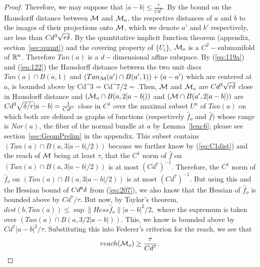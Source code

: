 \documentclass[final, 12pt]{colt2018} %
\begin{document}
\begin{proof}
Therefore, we may suppose that $|a-b| \leq \frac{\tau}{Cd^7}$.
By the bound on the Hausdorff distance between $\mathcal M$ and $\mathcal M_o$, the respective distances of $a$ and $b$ to the images of their projections onto $\mathcal M$, which we denote $a'$ and $b'$ respectively, are less than $Cd^3 \sqrt{r {\mathbf{\delta}}}$. By the quantitative implicit function theorem (appendix, section~\ref{sec:quant}) and the covering property of $\{U_i\}$, $\mathcal M_o$ is a $C^2-$submanifold of $\mathbb R^n$. Therefore $Tan(a)$ is a $d-$dimensional affine subspace. By  (\ref{eq:119a}) and (\ref{eq:122}) the Hausdorff distance between the two unit discs $Tan(a) \cap B(a, 1)$ and $(Tan_\mathcal M(a') \cap B(a',  1)) + (a - a')$ which are centered at $a$, is bounded above by \beq {} Cd^3  = Cd^{7/2}  = .\eeq Then, $\mathcal M$ and $\mathcal M_o$ are $Cd^3 \sqrt{r {\mathbf{\delta}}}$ close in Hausdorff distance and 
$(\mathcal M_o \cap B(a, 2|a-b|))$ and $(\mathcal M \cap B(a',  2|a-b|))$ are $Cd^3 \sqrt{{\mathbf{\delta}}/r}|a-b| = \frac{1}{Cd^{C}}$ close in $C^1$ over the maximal subset $U^a$ of $Tan(a)$ on which both are defined as graphs of functions  (respectively $\hat{f}_o$ and $\hat{f}$) whose range is $Nor(a)$, the fiber of the normal bundle at $a$ by Lemma~\ref{lem:6}; please see section~\ref{sec:GeomPrelim} in the appendix. This subset contains $(Tan(a) \cap B(a, 3|a-b|/2))$ because we further know by (\ref{eq:C1dist}) and the reach of $\mathcal M$ being at least $\tau$,
that the  $C^1$ norm of $\hat{f}$ on $(Tan(a) \cap B(a, 3|a-b|/2))$ is at most $(Cd^7)^{-1}$. 
Therefore, the  $C^1$ norm of $\hat{f}_o$ on $(Tan(a) \cap B(a, 3|a-b|/2))$ is at most $(Cd^7)^{-1}$. 
But using this and the Hessian bound of $C d^6 {\mathbf{\delta}}$ from (\ref{eq:207}), we also know that the Hessian of $\hat{f}_o$ is bounded above by $C d^7/\tau$. But now, by Taylor's theorem,  $dist(b, Tan(a)) \leq \sup \|Hess \hat{f}_o\||a-b|^2/2,$ where the supremum is taken over $(Tan(a) \cap B(a, 3/2|a-b|))$. This, we know is bounded above by $Cd^7|a-b|^2/\tau$. Substituting this into Federer's criterion for the reach, we see that $$reach(\mathcal M_o) \geq \frac{\tau}{Cd^7}.$$
\end{proof}
\end{document}
